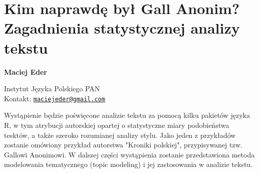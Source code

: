 \documentclass[\main/boa.tex]{subfiles}
\begin{document}
\section{Kim naprawdę był Gall Anonim? \\ Zagadnienia statystycznej analizy tekstu}


\begin{minipage}{0.915\textwidth}
	\centering
  {\bf \huge {} Maciej Eder}
\end{minipage}


\vskip 0.3cm

\begin{affiliations}
\begin{minipage}{0.915\textwidth}
\centering
\large Instytut Języka Polskiego PAN  \\[5pt]
Kontakt: \href{mailto:maciejeder@gmail.com}{\nolinkurl{maciejeder@gmail.com}}\\
\end{minipage}
\end{affiliations}

\vskip 0.8cm

Wystąpienie będzie poświęcone analizie tekstu za pomocą kilku pakietów języka R, w tym atrybucji autorskiej opartej o statystyczne miary podobieństwa tesktów, a także szeroko rozumianej analizy stylu. Jako jeden z przykładów zostanie omówiony przykład autorstwa "Kroniki polskiej", przypisywanej tzw. Gallowi Anonimowi. W dalszej części wystąpienia zostanie przedstawiona metoda modelowania tematycznego (topic modeling) i jej zastosowania w analizie tekstu. 
\end{document}
